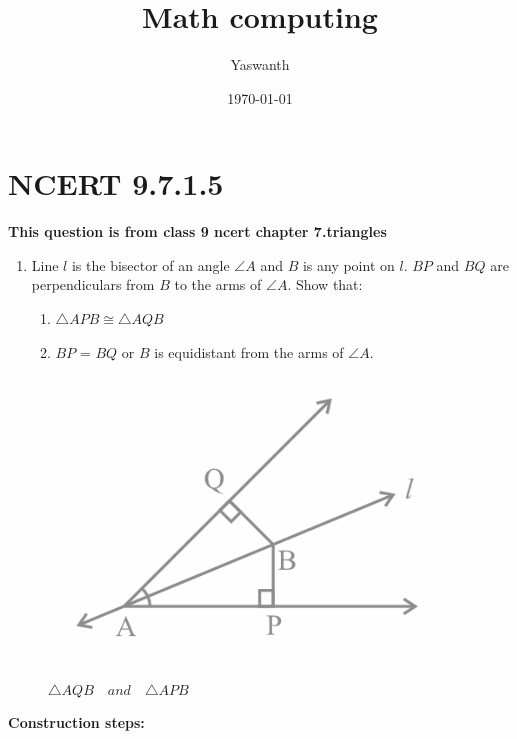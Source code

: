 \documentclass[11pt, a4paper]{article}
\title{ Math computing}
\author{ Yaswanth }
\date{\today}
\begin{document}
\vspace{-\baselineskip}
\maketitle

\section*{NCERT 9.7.1.5}

\textbf{This question is from class 9 ncert chapter 7.triangles}
\begin{enumerate}
    \item Line $l$ is the bisector of an angle $\angle A$ and $B$ is any point on $l$. $BP$ and $BQ$ are perpendiculars from $B$ to the arms of $\angle A$. Show that:
%
\begin{enumerate}
    \item $\triangle  APB \cong \triangle AQB$  
    \item $BP$ = $BQ$ or $B$ is equidistant from the arms of $\angle A$.
 \end{enumerate}
\end{enumerate}
\begin{figure}[H]
    \centering
    \includegraphics[width=1\columnwidth]{figs/fig_mc.png}
    \caption{$\triangle AQB \hspace{12pt} and \hspace{12pt} \triangle APB$}
    \label{fig:math_comp1}
\end{figure}
\pagebreak
\textbf{Construction steps:}
%
\end{document}
